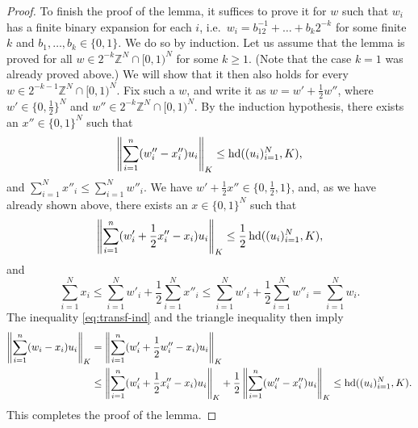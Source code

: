 \begin{proof}
  To finish the proof of the lemma, it suffices to prove it for $w$
  such that $w_i$ has a finite binary expansion for each $i$,
  i.e.~$w_i = b_12^{-1} + \ldots + b_k2^{-k}$ for some finite $k$ and
  $b_1, \ldots, b_k \in \{0,1\}$. We do so by induction. Let us assume
  that the lemma is proved for all $w \in 2^{-k}\mathbb{Z}^N\cap
  [0,1)^N$ for some $k \ge 1$. (Note that the case $k=1$ was already
  proved above.) We will show that it then also holds for every $w \in
  2^{-k-1}\mathbb{Z}^N\cap [0,1)^N$. Fix such a $w$, and write it as
  $w = w' + \frac12 w''$, where $w' \in \{0, \frac12\}^N$ and $w'' \in
  2^{-k}\mathbb{Z}^N\cap [0,1)^N$. By the induction hypothesis,
  there exists an $x'' \in \{0,1\}^N$ such that 
  \[
  \left\|\sum_{i = 1}^n(w_i'' - x_i'')u_i\right\|_K \le  \operatorname{hd}((u_i)_{i =  1}^N, K),
  \]
  and $\sum_{i = 1}^N x''_i \le \sum_{i = 1}^N w''_i$. We have $w' +
  \frac12 x'' \in \{0,\frac12, 1\}$, and, as we have already shown above, there
  exists an $x \in \{0,1\}^N$ such that 
  \begin{equation}\label{eq:transf-ind}
  \left\|\sum_{i = 1}^n(w_i' + \frac12 x''_i - x_i)u_i\right\|_K 
  \le \frac12 \operatorname{hd}((u_i)_{i =  1}^N, K),
  \end{equation}
  and 
  \[
  \sum_{i = 1}^N x_i \le \sum_{i = 1}^N{w'_i} + \frac12 \sum_{i = 1}^N{x''_i}
  \le \sum_{i = 1}^N{w'_i} + \frac12 \sum_{i = 1}^N{w''_i} 
  =   \sum_{i = 1}^N w_i.
  \]
  The inequality \eqref{eq:transf-ind} and the triangle inequality then imply
  \begin{align*}
  \left\|\sum_{i = 1}^n(w_i - x_i)u_i\right\|_K 
  &= 
  \left\|\sum_{i = 1}^n(w_i' + \frac12 w''_i - x_i)u_i\right\|_K \\
  &\le 
  \left\|\sum_{i = 1}^n(w_i' + \frac12 x''_i - x_i)u_i\right\|_K 
  + 
  \frac12 \left\|\sum_{i = 1}^n(w_i'' - x_i'')u_i\right\|_K 
  \le  \operatorname{hd}((u_i)_{i =  1}^N, K).
  \end{align*}
  This completes the proof of the lemma. 
\end{proof}


